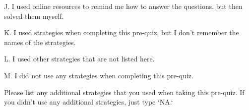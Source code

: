 \documentclass{ximera}
\begin{document}
\begin{question}
\begin{question}
    \begin{multipleChoice}
    \end{multipleChoice}
    
\end{question}
\begin{question}    
    
    J. I used online resources to remind me how to answer the questions, but then solved them myself.

    \begin{multipleChoice}
    \end{multipleChoice}
    
\end{question}
\begin{question}    
    
    K. I used strategies when completing this pre-quiz, but I don't remember the names of the strategies.

    \begin{multipleChoice}
    \end{multipleChoice}
    
\end{question}
\begin{question}    
    
    L. I used other strategies that are not listed here.

    \begin{multipleChoice}
    \end{multipleChoice}
    
\end{question}
\begin{question}    
    
    M. I did not use any strategies when completing this pre-quiz.

    \begin{multipleChoice}
    \end{multipleChoice}

\end{question}
\end{question}


\begin{question}
    Please list any additional strategies that you used when taking this pre-quiz. If you didn't use any additional strategies, just type `NA.`
   \begin{freeResponse}
   \end{freeResponse}
\end{question}



%
\end{document}
